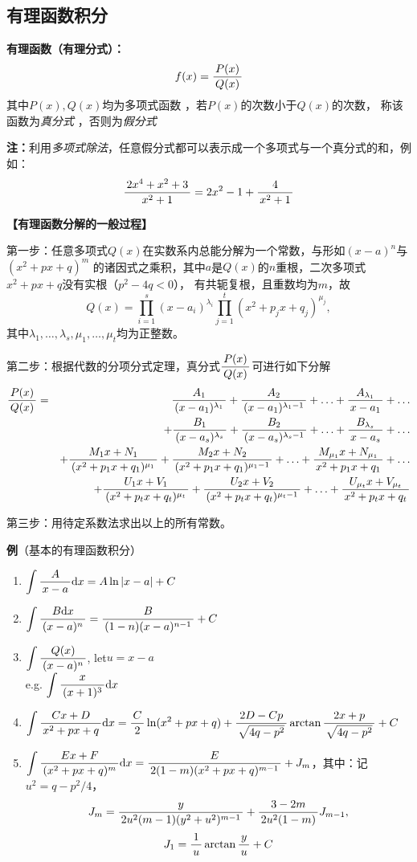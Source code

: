 \subsection{有理函数积分}

{\bf 有理函数（有理分式）：}$$f(x)=\df{P(x)}{Q(x)}$$
其中$P(x),Q(x)$均为多项式函数 ，若$P(x)$的次数小于$Q(x)$的次数，
称该函数为{\it 真分式} ，否则为{\it 假分式}

{\bf 注：}利用{\it 多项式除法}，任意假分式都可以表示成一个多项式与一个真分式的和，例如：
$$\df{2x^4+x^2+3}{x^2+1}=2x^2-1+\df{4}{x^2+1}$$

\begin{shaded}
{\bf 【有理函数分解的一般过程】}

第一步：任意多项式$Q(x)$在实数系内总能分解为一个常数，与形如$(x-a)^n$与$(x^2+px+q)^m$
的诸因式之乘积，其中$a$是$Q(x)$的$n$重根，二次多项式$x^2+px+q$没有实根（$p^2-4q<0$），
有共轭复根，且重数均为$m$，故
$$Q(x)=\prod\limits_{i=1}^s(x-a_i)^{\lambda_i}
\prod\limits_{j=1}^t(x^2+p_jx+q_j)^{\mu_j},$$
其中$\lambda_1,\ldots,\lambda_s,\mu_1,\ldots,\mu_t$均为正整数。

第二步：根据代数的分项分式定理，真分式$\df{P(x)}{Q(x)}$可进行如下分解
\begin{eqnarray*}
	\df{P(x)}{Q(x)}&=&\df{A_1}{(x-a_1)^{\lambda_1}}
	+\df{A_2}{(x-a_1)^{\lambda_1-1}}+\ldots
	+\df{A_{\lambda_1}}{x-a_1}+\ldots\\
	&&+\df{B_1}{(x-a_s)^{\lambda_s}}
	+\df{B_2}{(x-a_s)^{\lambda_s-1}}+\ldots
	+\df{B_{\lambda_s}}{x-a_s}+\ldots\\
	&&+\df{M_1x+N_1}{(x^2+p_1x+q_1)^{\mu_1}}
	+\df{M_2x+N_2}{(x^2+p_1x+q_1)^{\mu_1-1}}+\ldots
	+\df{M_{\mu_1}x+N_{\mu_1}}{x^2+p_1x+q_1}+\ldots\\
	&&+\df{U_1x+V_1}{(x^2+p_tx+q_t)^{\mu_t}}
	+\df{U_2x+V_2}{(x^2+p_tx+q_t)^{\mu_t-1}}+\ldots
	+\df{U_{\mu_t}x+V_{\mu_t}}{x^2+p_tx+q_t}
\end{eqnarray*}

第三步：用待定系数法求出以上的所有常数。
\end{shaded}

{\bf 例}（基本的有理函数积分）
\begin{enumerate}[(1)]
  \setlength{\itemindent}{1cm}
  \item $\dint\df A{x-a}\d x=A\ln|x-a|+C$ 
  \item $\dint\df{B\d x}{(x-a)^n}=\df B{(1-n)(x-a)^{n-1}}+C$
  \item $\dint\df{Q(x)}{(x-a)^n}$, let$u=x-a$\\
  e.g. $\dint\df x{(x+1)^3}\d x$ 
  \item $\dint\df{Cx+D}{x^2+px+q}\d x=
  \df C2\ln(x^2+px+q)+\df{2D-Cp}{\sqrt{4q-p^2}}
  \arctan\df{2x+p}{\sqrt{4q-p^2}}+C$
  \item $\dint\df{Ex+F}{(x^2+px+q)^m}\d x
  =\df E{2(1-m)(x^2+px+q)^{m-1}}+J_m$，其中：记$u^2=q-p^2/4$，
  $$J_m=\df{y}{2u^2(m-1)(y^2+u^2)^{m-1}}+
  \df{3-2m}{2u^2(1-m)}J_{m-1},$$
  $$J_1=\df1u\arctan\df yu+C$$
\end{enumerate}

